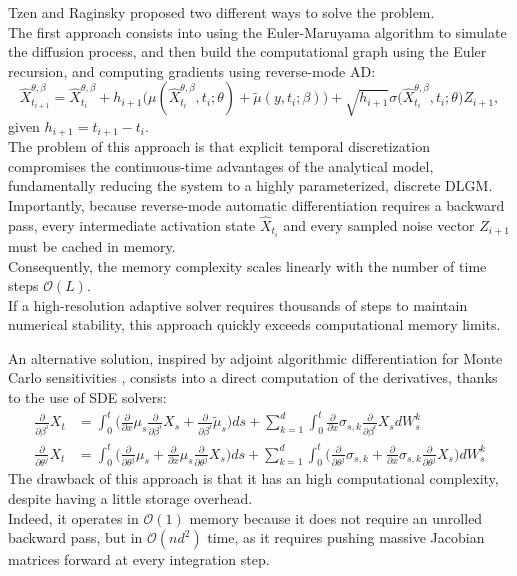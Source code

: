 \documentclass[11pt]{article}
\begin{document}
Tzen and Raginsky \cite{tzen2019neural} proposed two different ways to solve the problem. \\ 
The first approach consists into using the Euler-Maruyama algorithm to simulate the diffusion process, and then build the computational graph using the Euler recursion, and computing gradients using reverse-mode AD: 
\begin{equation}
  \hat X_{t_{i+1}}^{\theta, \beta} = \hat X_{t_i}^{\theta, \beta} + h_{i+1} \big(\mu( \hat X_{t_i}^{\theta, \beta}, t_i; \theta) + \tilde \mu (y, t_i; \beta) \big) + \sqrt{h_{i+1}} \sigma \big(\hat X_{t_i}^{\theta, \beta}, t_i;\theta \big)Z_{i+1},
\end{equation}  
given $h_{i+1} = t_{i+1} - t_i$. \\ 
The problem of this approach is that explicit temporal discretization compromises the continuous-time advantages of the analytical model, fundamentally reducing the system to a highly parameterized, discrete DLGM.
Importantly, because reverse-mode automatic differentiation requires a backward pass, every intermediate activation state $\hat{X}_{t_i}$ and every sampled noise vector $Z_{i+1}$ must be cached in memory. \\ 
Consequently, the memory complexity scales linearly with the number of time steps $\mathcal{O}(L)$. \\ 
If a high-resolution adaptive solver requires thousands of steps to maintain numerical stability, this approach quickly exceeds computational memory limits.

An alternative solution, inspired by adjoint algorithmic differentiation for Monte Carlo sensitivities \cite{giles2006smoking}, consists into a direct computation of the derivatives, thanks to the use of SDE solvers:
\begin{align}
  \frac{\partial}{\partial \beta^i}X_t &= \int_0^t \bigg(\frac{\partial}{\partial x}\mu_s \frac{\partial}{\partial \beta^i}X_s + \frac{\partial}{\partial \beta^i}\tilde \mu_s \bigg) ds + \sum_{k=1}^d \int_0^t \frac{\partial}{\partial x}\sigma_{s, k} \frac{\partial}{\partial \beta^i}X_s dW_s^k \\
  \frac{\partial}{\partial \theta^j}X_t &= \int_0^t \bigg(\frac{\partial}{\partial \theta^j}\mu_s + \frac{\partial}{\partial x}\mu_s \frac{\partial}{\partial \theta^j}X_s \bigg) ds + \sum_{k=1}^d \int_0^t \bigg(\frac{\partial}{\partial \theta^j}\sigma_{s, k} + \frac{\partial}{\partial x}\sigma_{s, k} \frac{\partial}{\partial \theta^j}X_s \bigg) dW_s^k
\end{align} 
The drawback of this approach is that it has an high computational complexity, despite having a little storage overhead. \\ 
Indeed, it operates in $\mathcal{O}(1)$ memory because it does not require an unrolled backward pass, but in $\mathcal{O}(nd^2)$ time, as it requires pushing massive Jacobian matrices forward at every integration step. 
\end{document}
